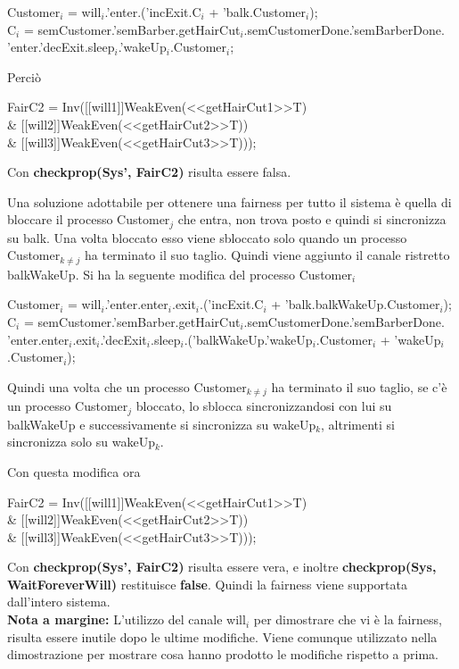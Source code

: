 \textsf{Customer$_{i}$ = will$_{i}$.'enter.('incExit.C$_{i}$ + 'balk.Customer$_{i}$);}\\
\textsf{C$_{i}$ = semCustomer.'semBarber.getHairCut$_{i}$.semCustomerDone.'semBarberDone.\\'enter.'decExit.sleep$_{i}$.'wakeUp$_{i}$.Customer$_{i}$;}

Perciò

\begin{center}
	\textsf{FairC2 = Inv([[will1]]WeakEven(<<getHairCut1>>T) \\\& [[will2]]WeakEven(<<getHairCut2>>T)) \\\& [[will3]]WeakEven(<<getHairCut3>>T)));}
\end{center}

Con \textbf{checkprop(Sys', FairC2)} risulta essere falsa.

Una soluzione adottabile per ottenere una fairness per tutto il sistema è quella di bloccare il processo \textsf{Customer$_{j}$} che entra, non trova posto e quindi si sincronizza su \textsf{balk}. Una volta bloccato esso viene sbloccato solo quando un processo \textsf{Customer$_{k\not=j}$} ha terminato il suo taglio. Quindi viene aggiunto il canale ristretto \textsf{balkWakeUp}. Si ha la seguente modifica del processo \textsf{Customer$_{i}$}

\textsf{Customer$_{i}$ = will$_{i}$.'enter.enter$_{i}$.exit$_{i}$.('incExit.C$_{i}$ + 'balk.balkWakeUp.Customer$_{i}$);}\\
\textsf{C$_{i}$ = semCustomer.'semBarber.getHairCut$_{i}$.semCustomerDone.'semBarberDone.\\'enter.enter$_{i}$.exit$_{i}$.'decExit$_{i}$.sleep$_{i}$.('balkWakeUp.'wakeUp$_{i}$.Customer$_{i}$ + 'wakeUp$_{i}$.Customer$_{i}$);}

Quindi una volta che un processo \textsf{Customer$_{k\not=j}$} ha terminato il suo taglio, se c'è un processo \textsf{Customer$_{j}$} bloccato, lo sblocca sincronizzandosi con lui su \textsf{balkWakeUp} e successivamente si sincronizza su \textsf{wakeUp$_{k}$}, altrimenti si sincronizza solo su \textsf{wakeUp$_{k}$}.

Con questa modifica ora 

\begin{center}
	\textsf{FairC2 = Inv([[will1]]WeakEven(<<getHairCut1>>T) \\\& [[will2]]WeakEven(<<getHairCut2>>T)) \\\& [[will3]]WeakEven(<<getHairCut3>>T)));}
\end{center}

Con \textbf{checkprop(Sys', FairC2)} risulta essere vera, e inoltre \textbf{checkprop(Sys, WaitForeverWill)} restituisce \textbf{false}. Quindi la fairness viene supportata dall'intero sistema. \\

\textbf{Nota a margine:} L'utilizzo del canale \textsf{will$_{i}$} per dimostrare che vi è la fairness, risulta essere inutile dopo le ultime modifiche. Viene comunque utilizzato nella dimostrazione per mostrare cosa hanno prodotto le modifiche rispetto a prima.